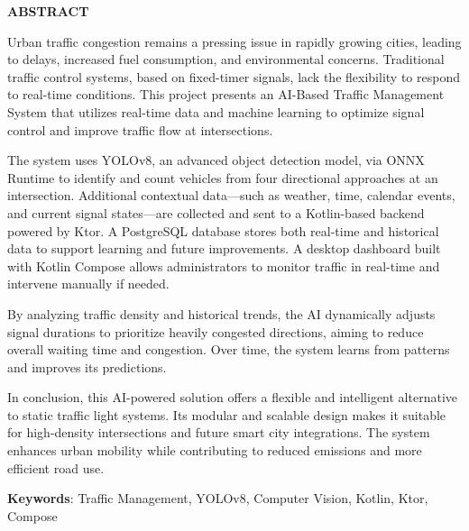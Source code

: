 \thispagestyle{plain}
\begin{center}
    \Large \textbf{\textcolor{GUBGreen}{ABSTRACT}}
\end{center}
\vspace{3\baselineskip}
\noindent
Urban traffic congestion remains a pressing issue in rapidly growing cities, leading to delays, increased fuel consumption, and environmental concerns. Traditional traffic control systems, based on fixed-timer signals, lack the flexibility to respond to real-time conditions. This project presents an AI-Based Traffic Management System that utilizes real-time data and machine learning to optimize signal control and improve traffic flow at intersections.


The system uses YOLOv8, an advanced object detection model, via ONNX Runtime to identify and count vehicles from four directional approaches at an intersection. Additional contextual data—such as weather, time, calendar events, and current signal states—are collected and sent to a Kotlin-based backend powered by Ktor. A PostgreSQL database stores both real-time and historical data to support learning and future improvements. A desktop dashboard built with Kotlin Compose allows administrators to monitor traffic in real-time and intervene manually if needed.


By analyzing traffic density and historical trends, the AI dynamically adjusts signal durations to prioritize heavily congested directions, aiming to reduce overall waiting time and congestion. Over time, the system learns from patterns and improves its predictions.


In conclusion, this AI-powered solution offers a flexible and intelligent alternative to static traffic light systems. Its modular and scalable design makes it suitable for high-density intersections and future smart city integrations. The system enhances urban mobility while contributing to reduced emissions and more efficient road use.


\vspace{\baselineskip}
\noindent
\textbf{Keywords}: Traffic Management, YOLOv8, Computer Vision, Kotlin, Ktor, Compose

